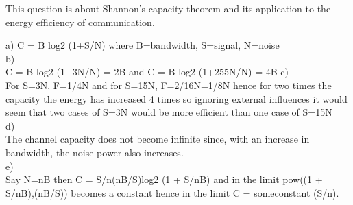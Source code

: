 \documentclass{cs-uob-exam}
\begin{document}
\begin{questions}
\question This question is about Shannon's capacity theorem and its application to the energy efficiency of communication.

\begin{solution}
a)
C = B log2 (1+S/N) where B=bandwidth, S=signal, N=noise\\
b)\\
C = B log2 (1+3N/N) = 2B and C = B log2 (1+255N/N) = 4B
c)\\
For S=3N, F=1/4N and for S=15N, F=2/16N=1/8N hence for two times the capacity the energy has increased 4 times so ignoring external influences it would seem that two cases of S=3N would be more efficient than one case of S=15N\\
d)\\
The channel capacity does not become infinite since, with an increase in bandwidth, the noise power also increases.\\
e)\\
Say N=nB then C = S/n(nB/S)log2 (1 + S/nB) and in the limit pow((1 + S/nB),(nB/S)) becomes a constant hence in the limit C = someconstant (S/n).
\end{solution}



\end{questions}
\end{document}
